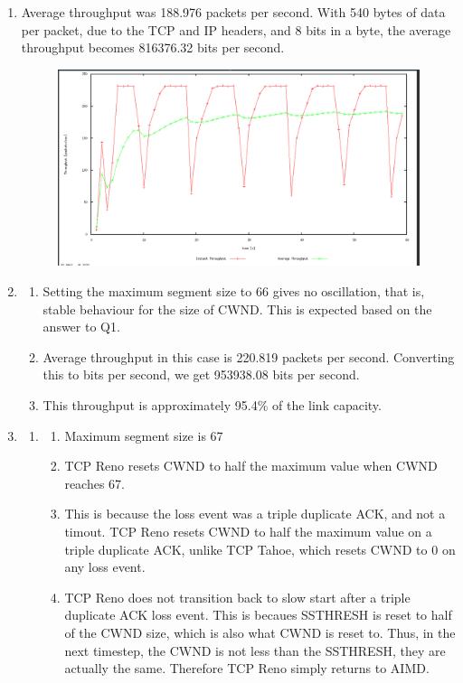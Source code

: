\documentclass[a4paper,11pt]{article}
\begin{document}
\begin{enumerate}[leftmargin=*]
	
	\item Average throughput was 188.976 packets per second. With 540 bytes of data per packet, due to the TCP and IP headers, and 8 bits in a byte, the average throughput becomes 816376.32 bits per second.
		\begin{figure}[!htb]
			\centering
		    \includegraphics[width=\linewidth, height=0.43\textheight]{tt2f.png}
		\end{figure}
		\pagebreak
	\item 
		\begin{enumerate}
			\item Setting the maximum segment size to 66 gives no oscillation, that is, stable behaviour for the size of CWND. This is expected based on the answer to Q1.
			\item Average throughput in this case is 220.819 packets per second. Converting this to bits per second, we get 953938.08 bits per second. 
			\item This throughput is approximately 95.4\% of the link capacity.
		\end{enumerate}

	\item 
		\begin{enumerate}[label=\arabic*.]
			\item 
				\begin{enumerate}[label=(\alph*)]
					\item Maximum segment size is 67
					\item TCP Reno resets CWND to half the maximum value when CWND reaches 67.
					\item This is because the loss event was a triple duplicate ACK, and not a timout. TCP Reno resets CWND to half the maximum value on a triple duplicate ACK, unlike TCP Tahoe, which resets CWND to 0 on any loss event.
					\item TCP Reno does not transition back to slow start after a triple duplicate ACK loss event. This is becaues SSTHRESH is reset to half of the CWND size, which is also what CWND is reset to. Thus, in the next timestep, the CWND is not less than the SSTHRESH, they are actually the same. Therefore TCP Reno simply returns to AIMD.
				\end{enumerate}


\end{enumerate}
\end{enumerate}
\end{document}
